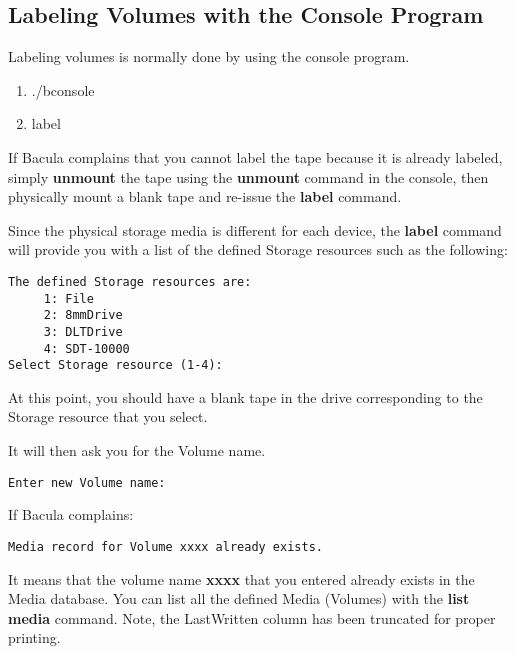 {{\subsection*{Labeling Volumes with the Console Program}

Labeling volumes is normally done by using the console program. 

\begin{enumerate}
\item ./bconsole  
\item label 
   \end{enumerate}

If Bacula complains that you cannot label the tape because it is already
labeled, simply {\bf unmount} the tape using the {\bf unmount} command in the
console, then physically mount a blank tape and re-issue the {\bf label}
command. 

Since the physical storage media is different for each device, the {\bf label}
command will provide you with a list of the defined Storage resources such as
the following: 

\footnotesize
\begin{verbatim}
The defined Storage resources are:
     1: File
     2: 8mmDrive
     3: DLTDrive
     4: SDT-10000
Select Storage resource (1-4):
\end{verbatim}
\normalsize

At this point, you should have a blank tape in the drive corresponding to the
Storage resource that you select. 

It will then ask you for the Volume name. 

\footnotesize
\begin{verbatim}
Enter new Volume name:
\end{verbatim}
\normalsize

If Bacula complains: 

\footnotesize
\begin{verbatim}
Media record for Volume xxxx already exists.
\end{verbatim}
\normalsize

It means that the volume name {\bf xxxx} that you entered already exists in
the Media database. You can list all the defined Media (Volumes) with the {\bf
list media} command. Note, the LastWritten column has been truncated for
proper printing. 

}}

